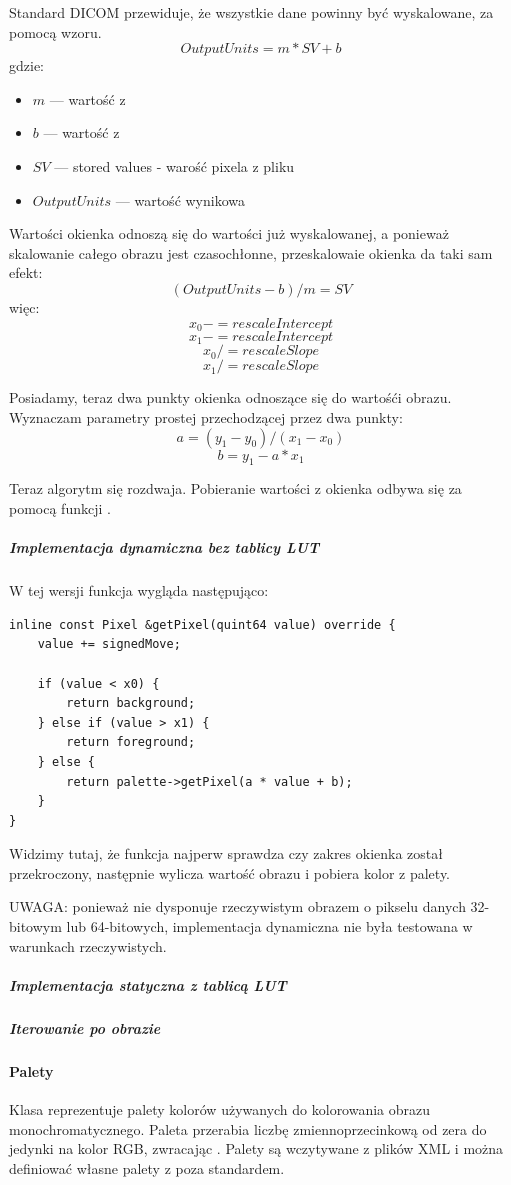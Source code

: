Standard DICOM przewiduje, że wszystkie dane powinny być wyskalowane, za pomocą wzoru.
\[OutputUnits = m*SV + b\]
gdzie:
\begin{itemize}
    \item $m$ --- wartość z 
    \item $b$ --- wartość z 
    \item $SV$ --- stored values - warość pixela z pliku
    \item $OutputUnits$ --- wartość wynikowa
\end{itemize}

Wartości okienka odnoszą się do wartości już wyskalowanej, a ponieważ skalowanie całego obrazu jest czasochłonne, przeskalowaie okienka da taki sam efekt:
\[(OutputUnits - b ) / m = SV \]
więc:
\[x_0 -= rescaleIntercept\]
\[x_1 -= rescaleIntercept\]
\[x_0 /= rescaleSlope\]
\[x_1 /= rescaleSlope\]

Posiadamy, teraz dwa punkty okienka odnoszące się do wartośći obrazu.
Wyznaczam parametry prostej przechodzącej przez dwa punkty:
\[a = (y_1 - y_0) / (x_1 - x_0)\]
\[b = y_1 - a * x_1\]

\par
Teraz algorytm się rozdwaja.
Pobieranie wartości z okienka odbywa się za pomocą funkcji .


\subparagraph{Implementacja dynamiczna bez tablicy LUT}

\par
W tej wersji funkcja  wygląda następująco:
\par
\begin{lstlisting}
inline const Pixel &getPixel(quint64 value) override {
    value += signedMove;

    if (value < x0) {
        return background;
    } else if (value > x1) {
        return foreground;
    } else {
        return palette->getPixel(a * value + b);
    }
}
\end{lstlisting}
\par
Widzimy tutaj, że funkcja najperw sprawdza czy zakres okienka został przekroczony, następnie wylicza wartość obrazu i pobiera kolor z palety.
\par
UWAGA: ponieważ nie dysponuje rzeczywistym obrazem o pikselu danych 32-bitowym lub 64-bitowych, implementacja dynamiczna nie była testowana w warunkach rzeczywistych.

\subparagraph{Implementacja statyczna z tablicą LUT}

\subparagraph{Iterowanie po obrazie}

\paragraph{Palety}
Klasa  reprezentuje palety kolorów używanych do kolorowania obrazu monochromatycznego.
Paleta przerabia liczbę zmiennoprzecinkową od zera do jedynki na kolor RGB, zwracając .
Palety są wczytywane z plików XML i można definiować własne palety z poza standardem.

